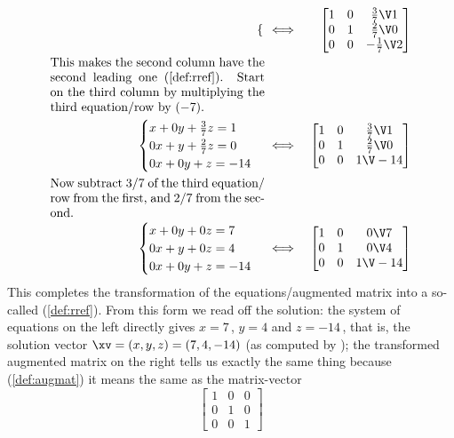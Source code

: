 \begin{example}
\begin{solution}
\begin{eqnarray*}
\begin{cases}
\end{cases}
&\iff&%
\begin{bmatrix} 1&0&\frac37\V1\\0&1&\frac27\V0\\0&0&-\frac17\V2 \end{bmatrix}
\\[0ex plus 1ex]
\parbox{0.5\linewidth}{This makes the second column have the second leading one (\cref{def:rref}).  
Start on the third column by multiplying the third equation\slash row by~\((-7)\).}
\\[0ex plus 1ex]
\begin{cases}
x+0y+\frac37z=1\\ 0x+y+\frac27z=0\\ 0x+0y+z=-14
\end{cases}
&\iff&%
\begin{bmatrix} 1&0&\frac37\V1\\0&1&\frac27\V0\\0&0&1\V-14 \end{bmatrix}
\\[0ex plus 1ex]
\parbox{0.5\linewidth}{Now subtract \(3/7\)~of the third equation\slash row from the first, and \(2/7\) from the second.}
\\[0ex plus 1ex]
\begin{cases}
x+0y+0z=7\\ 0x+y+0z=4\\ 0x+0y+z=-14
\end{cases}
&\iff&%
\begin{bmatrix} 1&0&0\V7\\0&1&0\V4\\0&0&1\V-14 \end{bmatrix}
\end{eqnarray*}
This completes the transformation of the equations\slash augmented matrix into a so-called  (\cref{def:rref}).
From this form we read off the solution:  the system of equations on the left directly gives \(x=7\)\,, \(y=4\) and \(z=-14\)\,, that is, the solution vector \(\xv=(x,y,z)=(7,4,-14)\) (as computed by \script);
the transformed augmented matrix on the right tells us exactly the same thing because (\cref{def:augmat}) it means the same as the matrix-vector 
\begin{equation*}
\begin{bmatrix} 1&0&0\\0&1&0\\0&0&1 \end{bmatrix}

\end{equation*}
\end{solution}
\end{example}
